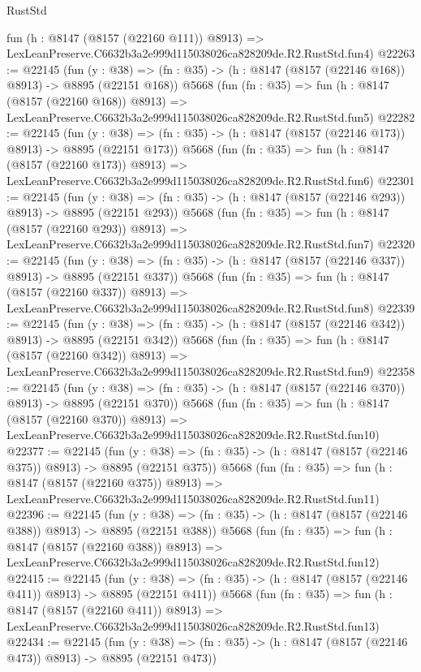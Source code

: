 \begin{lexlean}{RustStd}
\begin{coremodule}
    fun (h : @8147 (@8157 (@22160 @111)) @8913) =>
    LexLeanPreserve.C6632b3a2e999d115038026ca828209de.R2.RustStd.fun4)
@22263 := @22145
    (fun (y : @38) => (fn : @35) -> (h : @8147 (@8157 (@22146 @168)) @8913) -> @8895 (@22151 @168))
    @5668
    (fun (fn : @35) =>
    fun (h : @8147 (@8157 (@22160 @168)) @8913) =>
    LexLeanPreserve.C6632b3a2e999d115038026ca828209de.R2.RustStd.fun5)
@22282 := @22145
    (fun (y : @38) => (fn : @35) -> (h : @8147 (@8157 (@22146 @173)) @8913) -> @8895 (@22151 @173))
    @5668
    (fun (fn : @35) =>
    fun (h : @8147 (@8157 (@22160 @173)) @8913) =>
    LexLeanPreserve.C6632b3a2e999d115038026ca828209de.R2.RustStd.fun6)
@22301 := @22145
    (fun (y : @38) => (fn : @35) -> (h : @8147 (@8157 (@22146 @293)) @8913) -> @8895 (@22151 @293))
    @5668
    (fun (fn : @35) =>
    fun (h : @8147 (@8157 (@22160 @293)) @8913) =>
    LexLeanPreserve.C6632b3a2e999d115038026ca828209de.R2.RustStd.fun7)
@22320 := @22145
    (fun (y : @38) => (fn : @35) -> (h : @8147 (@8157 (@22146 @337)) @8913) -> @8895 (@22151 @337))
    @5668
    (fun (fn : @35) =>
    fun (h : @8147 (@8157 (@22160 @337)) @8913) =>
    LexLeanPreserve.C6632b3a2e999d115038026ca828209de.R2.RustStd.fun8)
@22339 := @22145
    (fun (y : @38) => (fn : @35) -> (h : @8147 (@8157 (@22146 @342)) @8913) -> @8895 (@22151 @342))
    @5668
    (fun (fn : @35) =>
    fun (h : @8147 (@8157 (@22160 @342)) @8913) =>
    LexLeanPreserve.C6632b3a2e999d115038026ca828209de.R2.RustStd.fun9)
@22358 := @22145
    (fun (y : @38) => (fn : @35) -> (h : @8147 (@8157 (@22146 @370)) @8913) -> @8895 (@22151 @370))
    @5668
    (fun (fn : @35) =>
    fun (h : @8147 (@8157 (@22160 @370)) @8913) =>
    LexLeanPreserve.C6632b3a2e999d115038026ca828209de.R2.RustStd.fun10)
@22377 := @22145
    (fun (y : @38) => (fn : @35) -> (h : @8147 (@8157 (@22146 @375)) @8913) -> @8895 (@22151 @375))
    @5668
    (fun (fn : @35) =>
    fun (h : @8147 (@8157 (@22160 @375)) @8913) =>
    LexLeanPreserve.C6632b3a2e999d115038026ca828209de.R2.RustStd.fun11)
@22396 := @22145
    (fun (y : @38) => (fn : @35) -> (h : @8147 (@8157 (@22146 @388)) @8913) -> @8895 (@22151 @388))
    @5668
    (fun (fn : @35) =>
    fun (h : @8147 (@8157 (@22160 @388)) @8913) =>
    LexLeanPreserve.C6632b3a2e999d115038026ca828209de.R2.RustStd.fun12)
@22415 := @22145
    (fun (y : @38) => (fn : @35) -> (h : @8147 (@8157 (@22146 @411)) @8913) -> @8895 (@22151 @411))
    @5668
    (fun (fn : @35) =>
    fun (h : @8147 (@8157 (@22160 @411)) @8913) =>
    LexLeanPreserve.C6632b3a2e999d115038026ca828209de.R2.RustStd.fun13)
@22434 := @22145
    (fun (y : @38) => (fn : @35) -> (h : @8147 (@8157 (@22146 @473)) @8913) -> @8895 (@22151 @473))

\end{coremodule}
\end{lexlean}
